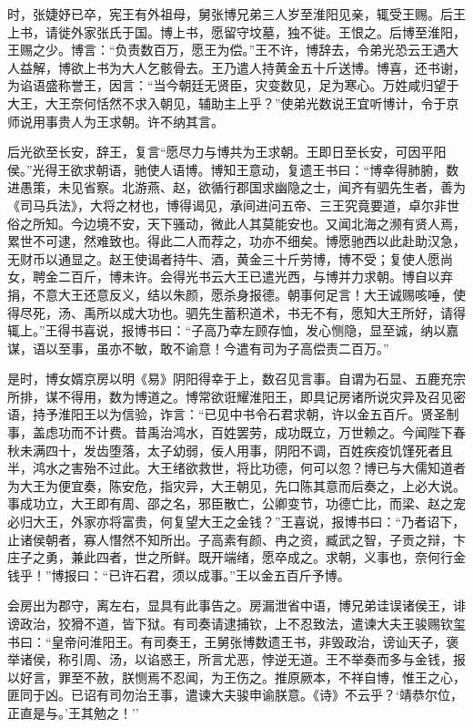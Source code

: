 \documentclass[]{article}
\begin{document}
时，张婕妤已卒，宪王有外祖母，舅张博兄弟三人岁至淮阳见亲，辄受王赐。后王上书，请徙外家张氏于国。博上书，愿留守坟墓，独不徙。王恨之。后博至淮阳，王赐之少。博言：``负责数百万，愿王为偿。''王不许，博辞去，令弟光恐云王遇大人益解，博欲上书为大人乞骸骨去。王乃遣人持黄金五十斤送博。博喜，还书谢，为谄语盛称誉王，因言：``当今朝廷无贤臣，灾变数见，足为寒心。万姓咸归望于大王，大王奈何恬然不求入朝见，辅助主上乎？''使弟光数说王宜听博计，令于京师说用事贵人为王求朝。许不纳其言。

后光欲至长安，辞王，复言``愿尽力与博共为王求朝。王即日至长安，可因平阳侯。''光得王欲求朝语，驰使人语博。博知王意动，复遗王书曰：``博幸得肺腑，数进愚策，未见省察。北游燕、赵，欲循行郡国求幽隐之士，闻齐有驷先生者，善为《司马兵法》，大将之材也，博得谒见，承间进问五帝、三王究竟要道，卓尔非世俗之所知。今边境不安，天下骚动，微此人其莫能安也。又闻北海之濒有贤人焉，累世不可逮，然难致也。得此二人而荐之，功亦不细矣。博愿驰西以此赴助汉急，无财币以通显之。赵王使谒者持牛、酒，黄金三十斤劳博，博不受；复使人愿尚女，聘金二百斤，博未许。会得光书云大王已遣光西，与博并力求朝。博自以弃捐，不意大王还意反义，结以朱颜，愿杀身报德。朝事何足言！大王诚赐咳唾，使得尽死，汤、禹所以成大功也。驷先生蓄积道术，书无不有，愿知大王所好，请得辄上。''王得书喜说，报博书曰：``子高乃幸左顾存恤，发心恻隐，显至诚，纳以嘉谋，语以至事，虽亦不敏，敢不谕意！今遣有司为子高偿责二百万。''

是时，博女婿京房以明《易》阴阳得幸于上，数召见言事。自谓为石显、五鹿充宗所排，谋不得用，数为博道之。博常欲诳耀淮阳王，即具记房诸所说灾异及召见密语，持予淮阳王以为信验，诈言：``已见中书令石君求朝，许以金五百斤。贤圣制事，盖虑功而不计费。昔禹治鸿水，百姓罢劳，成功既立，万世赖之。今闻陛下春秋未满四十，发齿堕落，太子幼弱，佞人用事，阴阳不调，百姓疾疫饥馑死者且半，鸿水之害殆不过此。大王绪欲救世，将比功德，何可以忽？博已与大儒知道者为大王为便宜奏，陈安危，指灾异，大王朝见，先口陈其意而后奏之，上必大说。事成功立，大王即有周、邵之名，邪臣散亡，公卿变节，功德亡比，而梁、赵之宠必归大王，外家亦将富贵，何复望大王之金钱？''王喜说，报博书曰：``乃者诏下，止诸侯朝者，寡人憯然不知所出。子高素有颜、冉之资，臧武之智，子贡之辩，卞庄子之勇，兼此四者，世之所鲜。既开端绪，愿卒成之。求朝，义事也，奈何行金钱乎！''博报曰：``已许石君，须以成事。''王以金五百斤予博。

会房出为郡守，离左右，显具有此事告之。房漏泄省中语，博兄弟诖误诸侯王，诽谤政治，狡猾不道，皆下狱。有司奏请逮捕钦，上不忍致法，遣谏大夫王骏赐钦玺书曰：``皇帝问淮阳王。有司奏王，王舅张博数遗王书，非毁政治，谤讪天子，褒举诸侯，称引周、汤，以谄惑王，所言尤恶，悖逆无道。王不举奏而多与金钱，报以好言，罪至不赦，朕恻焉不忍闻，为王伤之。推原厥本，不祥自博，惟王之心，匪同于凶。已诏有司勿治王事，遣谏大夫骏申谕朕意。《诗》不云乎？`靖恭尔位，正直是与。'王其勉之！''
\end{document}
